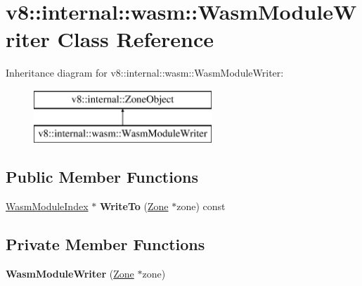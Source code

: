 \hypertarget{classv8_1_1internal_1_1wasm_1_1_wasm_module_writer}{}\section{v8\+:\+:internal\+:\+:wasm\+:\+:Wasm\+Module\+Writer Class Reference}
\label{classv8_1_1internal_1_1wasm_1_1_wasm_module_writer}
Inheritance diagram for v8\+:\+:internal\+:\+:wasm\+:\+:Wasm\+Module\+Writer\+:\begin{figure}[H]
\begin{center}
\leavevmode
\includegraphics[height=2.000000cm]{classv8_1_1internal_1_1wasm_1_1_wasm_module_writer}
\end{center}
\end{figure}
\subsection*{Public Member Functions}
\begin{DoxyCompactItemize}
\item 
\hyperlink{classv8_1_1internal_1_1wasm_1_1_wasm_module_index}{Wasm\+Module\+Index} $\ast$ {\bfseries Write\+To} (\hyperlink{classv8_1_1internal_1_1_zone}{Zone} $\ast$zone) const \hypertarget{classv8_1_1internal_1_1wasm_1_1_wasm_module_writer_a1706942dd03fd9db89984156839418eb}{}\label{classv8_1_1internal_1_1wasm_1_1_wasm_module_writer_a1706942dd03fd9db89984156839418eb}

\end{DoxyCompactItemize}
\subsection*{Private Member Functions}
\begin{DoxyCompactItemize}
\item 
{\bfseries Wasm\+Module\+Writer} (\hyperlink{classv8_1_1internal_1_1_zone}{Zone} $\ast$zone)\hypertarget{classv8_1_1internal_1_1wasm_1_1_wasm_module_writer_aaca0f48ed39f723798c922dbf623e5e2}{}\label{classv8_1_1internal_1_1wasm_1_1_wasm_module_writer_aaca0f48ed39f723798c922dbf623e5e2}

\end{DoxyCompactItemize}
